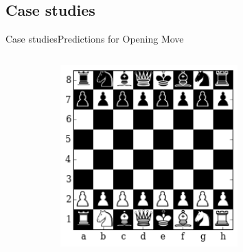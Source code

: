 \documentclass[9pt, unknownkeysallowed]{beamer}
\begin{document}
\subsection{Case studies}
\begin{frame}{Case studies}{Predictions for Opening Move}
 \begin{columns}[c]
 \begin{column}{4cm}
 \begin{figure}[H]
 \centering
    \begin{subfigure}[t]{\textwidth}
	
\includegraphics[width=0.75\textwidth]{../img/best_moves/output_17_0.png}
        \label{figure:initialboarda}
    \end{subfigure}%
  \\
    \begin{subfigure}[t]{\textwidth}
        

\end{subfigure}
\end{figure}
\end{column}
\end{columns}
\end{frame}
\end{document}
